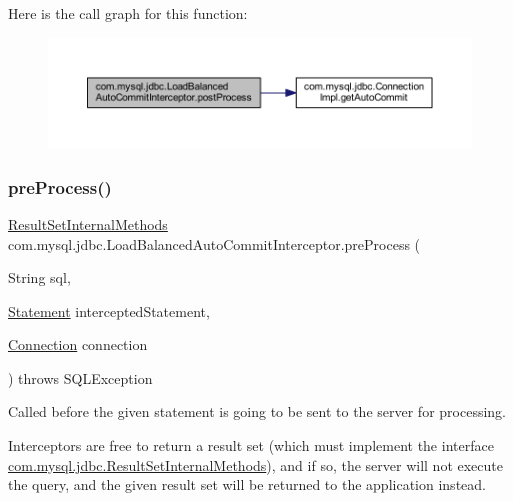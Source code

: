 Here is the call graph for this function\+:
\nopagebreak
\begin{figure}[H]
\begin{center}
\leavevmode
\includegraphics[width=350pt]{classcom_1_1mysql_1_1jdbc_1_1_load_balanced_auto_commit_interceptor_a54b925109880e6e84eb16b36f608ecd3_cgraph}
\end{center}
\end{figure}
\mbox{\label{classcom_1_1mysql_1_1jdbc_1_1_load_balanced_auto_commit_interceptor_a6a69c6841856a5f6f8062206f2854d76}} 
\subsubsection{\texorpdfstring{pre\+Process()}{preProcess()}}
{\footnotesize\ttfamily \mbox{\hyperlink{interfacecom_1_1mysql_1_1jdbc_1_1_result_set_internal_methods}{Result\+Set\+Internal\+Methods}} com.\+mysql.\+jdbc.\+Load\+Balanced\+Auto\+Commit\+Interceptor.\+pre\+Process (\begin{DoxyParamCaption}\item[{String}]{sql,  }\item[{\mbox{\hyperlink{interfacecom_1_1mysql_1_1jdbc_1_1_statement}{Statement}}}]{intercepted\+Statement,  }\item[{\mbox{\hyperlink{interfacecom_1_1mysql_1_1jdbc_1_1_connection}{Connection}}}]{connection }\end{DoxyParamCaption}) throws S\+Q\+L\+Exception}

Called before the given statement is going to be sent to the server for processing.

Interceptors are free to return a result set (which must implement the interface \mbox{\hyperlink{interfacecom_1_1mysql_1_1jdbc_1_1_result_set_internal_methods}{com.\+mysql.\+jdbc.\+Result\+Set\+Internal\+Methods}}), and if so, the server will not execute the query, and the given result set will be returned to the application instead.

